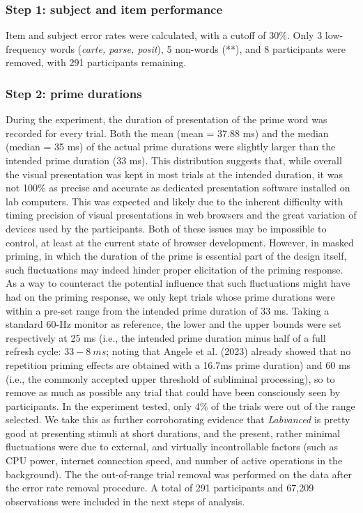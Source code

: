 \documentclass[
]{interact}
\begin{document}
\subsubsection{Step 1: subject and item
performance}\label{sec-exp1-analysis-performance}

Item and subject error rates were calculated, with a cutoff of 30\%.
Only 3 low-frequency words (\emph{carte, parse, posit}), 5 non-words
(**), and 8 participants were removed, with 291 participants remaining.

\subsubsection{Step 2: prime
durations}\label{sec-exp1-analysis-primeTime}

During the experiment, the duration of presentation of the prime word
was recorded for every trial. Both the mean (mean = 37.88 ms) and the
median (median = 35 ms) of the actual prime durations were slightly
larger than the intended prime duration (33 ms). This distribution
suggests that, while overall the visual presentation was kept in most
trials at the intended duration, it was not 100\% as precise and
accurate as dedicated presentation software installed on lab computers.
This was expected and likely due to the inherent difficulty with timing
precision of visual presentations in web browsers and the great
variation of devices used by the participants. Both of these issues may
be impossible to control, at least at the current state of browser
development. However, in masked priming, in which the duration of the
prime is essential part of the design itself, such fluctuations may
indeed hinder proper elicitation of the priming response. As a way to
counteract the potential influence that such fluctuations might have had
on the priming response, we only kept trials whose prime durations were
within a pre-set range from the intended prime duration of 33 ms. Taking
a standard 60-Hz monitor as reference, the lower and the upper bounds
were set respectively at 25 ms (i.e., the intended prime duration minus
half of a full refresh cycle: \(33-8~ ms\); noting that Angele et al.
(2023) already showed that no repetition priming effects are obtained
with a 16.7ms prime duration) and 60 ms (i.e., the commonly accepted
upper threshold of subliminal processing), so to remove as much as
possible any trial that could have been consciously seen by
participants. In the experiment tested, only 4\% of the trials were out
of the range selected. We take this as further corroborating evidence
that \emph{Labvanced} is pretty good at presenting stimuli at short
durations, and the present, rather minimal fluctuations were due to
external, and virtually incontrollable factors (such as CPU power,
internet connection speed, and number of active operations in the
background). The the out-of-range trial removal was performed on the
data after the error rate removal procedure. A total of 291 participants
and 67,209 observations were included in the next steps of analysis.
\end{document}
